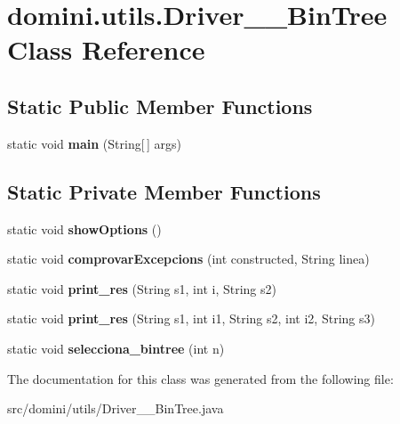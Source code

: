 \hypertarget{classdomini_1_1utils_1_1Driver____BinTree}{}\section{domini.\+utils.\+Driver\+\_\+\+\_\+\+Bin\+Tree Class Reference}
\label{classdomini_1_1utils_1_1Driver____BinTree}
\subsection*{Static Public Member Functions}
\begin{DoxyCompactItemize}
\item 
\mbox{\label{classdomini_1_1utils_1_1Driver____BinTree_a08875cef02b7a770a105b0b6b976a681}} 
static void {\bfseries main} (String\mbox{[}$\,$\mbox{]} args)
\end{DoxyCompactItemize}
\subsection*{Static Private Member Functions}
\begin{DoxyCompactItemize}
\item 
\mbox{\label{classdomini_1_1utils_1_1Driver____BinTree_ab2a1528bc1f0c678cf0d577a79437129}} 
static void {\bfseries show\+Options} ()
\item 
\mbox{\label{classdomini_1_1utils_1_1Driver____BinTree_a6387c56437c50b0e2e691667a9a0785b}} 
static void {\bfseries comprovar\+Excepcions} (int constructed, String linea)
\item 
\mbox{\label{classdomini_1_1utils_1_1Driver____BinTree_a434e26afb3eb701558d81b0fd1c29dcb}} 
static void {\bfseries print\+\_\+res} (String s1, int i, String s2)
\item 
\mbox{\label{classdomini_1_1utils_1_1Driver____BinTree_a2d59fc46084a11fab2c22ce35c693f60}} 
static void {\bfseries print\+\_\+res} (String s1, int i1, String s2, int i2, String s3)
\item 
\mbox{\label{classdomini_1_1utils_1_1Driver____BinTree_a0d90bf2cb928174547e712140b5a4fe5}} 
static void {\bfseries selecciona\+\_\+bintree} (int n)
\end{DoxyCompactItemize}


The documentation for this class was generated from the following file\+:\begin{DoxyCompactItemize}
\item 
src/domini/utils/Driver\+\_\+\+\_\+\+Bin\+Tree.\+java\end{DoxyCompactItemize}
